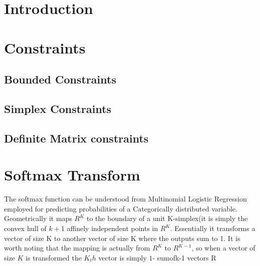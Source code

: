 \documentclass[twoside]{article}
\begin{document}
%

%

\onecolumn
{}

\section{Introduction}

\section{Constraints}
\subsection{Bounded Constraints}
\subsection{Simplex Constraints}
\subsection{Definite Matrix constraints}
\section{Softmax Transform}

The softmax function can be understood from Multinomial Logistic Regression employed for predicting probabilities of a Categorically distributed variable. Geometrically it maps $R^K$ to the boundary of a unit K-simplex(it is simply the convex hull of $k+1$ affinely independent points in $R^K$. Essentially it transforms a vector of size K to another vector of size K where the outputs sum to 1. It is worth noting that the mapping is actually from $R^K$ to $R^{K-1}$, so when a vector of size $K$ is transformed the $K_th$ vector is simply $1$- sumofk-1 vectors
R
\end{document}
